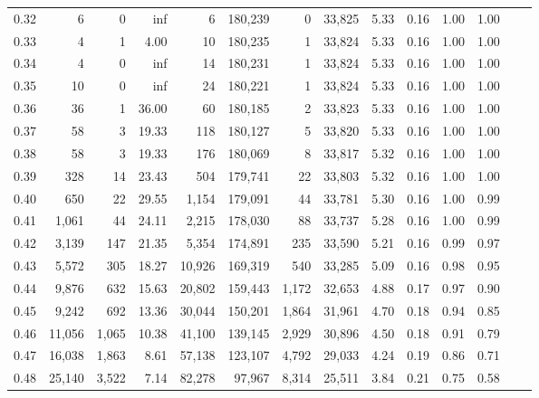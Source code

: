 \begin{tabular}{rrrrrrrrrrrrrr}
0.32 &       6 &      0 &     inf &        6 &  180,239 &       0 &  33,825 &  5.33 &  0.16 &  1.00 &      1.00 \\
0.33 &       4 &      1 &    4.00 &       10 &  180,235 &       1 &  33,824 &  5.33 &  0.16 &  1.00 &      1.00 \\
0.34 &       4 &      0 &     inf &       14 &  180,231 &       1 &  33,824 &  5.33 &  0.16 &  1.00 &      1.00 \\
0.35 &      10 &      0 &     inf &       24 &  180,221 &       1 &  33,824 &  5.33 &  0.16 &  1.00 &      1.00 \\
0.36 &      36 &      1 &   36.00 &       60 &  180,185 &       2 &  33,823 &  5.33 &  0.16 &  1.00 &      1.00 \\
0.37 &      58 &      3 &   19.33 &      118 &  180,127 &       5 &  33,820 &  5.33 &  0.16 &  1.00 &      1.00 \\
0.38 &      58 &      3 &   19.33 &      176 &  180,069 &       8 &  33,817 &  5.32 &  0.16 &  1.00 &      1.00 \\
0.39 &     328 &     14 &   23.43 &      504 &  179,741 &      22 &  33,803 &  5.32 &  0.16 &  1.00 &      1.00 \\
0.40 &     650 &     22 &   29.55 &    1,154 &  179,091 &      44 &  33,781 &  5.30 &  0.16 &  1.00 &      0.99 \\
0.41 &   1,061 &     44 &   24.11 &    2,215 &  178,030 &      88 &  33,737 &  5.28 &  0.16 &  1.00 &      0.99 \\
0.42 &   3,139 &    147 &   21.35 &    5,354 &  174,891 &     235 &  33,590 &  5.21 &  0.16 &  0.99 &      0.97 \\
0.43 &   5,572 &    305 &   18.27 &   10,926 &  169,319 &     540 &  33,285 &  5.09 &  0.16 &  0.98 &      0.95 \\
0.44 &   9,876 &    632 &   15.63 &   20,802 &  159,443 &   1,172 &  32,653 &  4.88 &  0.17 &  0.97 &      0.90 \\
0.45 &   9,242 &    692 &   13.36 &   30,044 &  150,201 &   1,864 &  31,961 &  4.70 &  0.18 &  0.94 &      0.85 \\
0.46 &  11,056 &  1,065 &   10.38 &   41,100 &  139,145 &   2,929 &  30,896 &  4.50 &  0.18 &  0.91 &      0.79 \\
0.47 &  16,038 &  1,863 &    8.61 &   57,138 &  123,107 &   4,792 &  29,033 &  4.24 &  0.19 &  0.86 &      0.71 \\
0.48 &  25,140 &  3,522 &    7.14 &   82,278 &   97,967 &   8,314 &  25,511 &  3.84 &  0.21 &  0.75 &      0.58 \\

\end{tabular}
